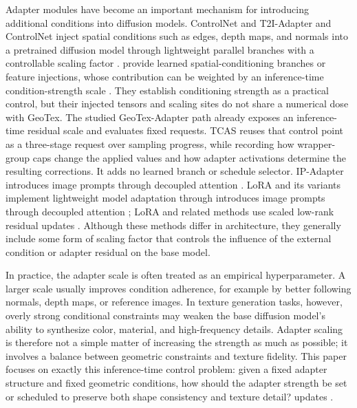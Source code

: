 \documentclass[times,twocolumn,final]{elsarticle}
\providecommand{\DIFadd}[1]{{\protect\color{blue} \sf #1}} %
\providecommand{\DIFdel}[1]{{\protect\color{red} \scriptsize #1}} %
\providecommand{\DIFaddbegin}{} %
\providecommand{\DIFaddend}{} %
\providecommand{\DIFdelbegin}{} %
\providecommand{\DIFdelend}{} %
\begin{document}
\DIFdelbegin \DIFdel{Adapter modules have become an important mechanism for introducing additional conditions into diffusion models. }\DIFdelend \DIFaddbegin \DIFadd{ControlNet and }\DIFaddend T2I-Adapter \DIFdelbegin \DIFdel{and ControlNet inject spatial conditions such as edges, depth maps, and normals into a pretrained diffusion model through lightweight parallel branches with a controllable scaling factor \cite{mou2023t2iadapter,zhang2023controlnet}. }\DIFdelend \DIFaddbegin \DIFadd{provide learned spatial-conditioning branches or feature injections, whose contribution can be weighted by an inference-time condition-strength scale \cite{mou2023t2iadapter,zhang2023controlnet}. They establish conditioning strength as a practical control, but their injected tensors and scaling sites do not share a numerical dose with GeoTex. The studied GeoTex-Adapter path already exposes an inference-time residual scale and evaluates fixed requests. TCAS reuses that control point as a three-stage request over sampling progress, while recording how wrapper-group caps change the applied values and how adapter activations determine the resulting corrections. It adds no learned branch or schedule selector. }\DIFaddend IP-Adapter \DIFdelbegin \DIFdel{introduces image prompts through decoupled attention \cite{ye2023ipadapter}. LoRA and its variants implement lightweight model adaptation through }\DIFdelend \DIFaddbegin \DIFadd{introduces image prompts through decoupled attention \cite{ye2023ipadapter}; LoRA and related methods use scaled }\DIFaddend low-rank \DIFdelbegin \DIFdel{residual updates \cite{hu2022lora,liu2024dora,zhang2023adalora}. Although these methods differ in architecture, they generally include some form of scaling factor that controls the influence of the external condition or adapter residual on the base model.
}%

\DIFdel{In practice, the adapter scale is often treated as an empirical hyperparameter. A larger scale usually improves condition adherence, for example by better following normals, depth maps, or reference images. In texture generation tasks, however, overly strong conditional constraints may weaken the base diffusion model's ability to synthesize color, material, and high-frequency details. Adapter scaling is therefore not a simple matter of increasing the strength as much as possible; it involves a balance between geometric constraints and texture fidelity. This paper focuses on exactly this inference-time control problem: given a fixed adapter structure and fixed geometric conditions, how should the adapter strength be set or scheduled to preserve both shape consistency and texture detail?
}\DIFdelend \DIFaddbegin \DIFadd{updates \cite{hu2022lora,liu2024dora,zhang2023adalora}.
}\DIFaddend 
\end{document}
